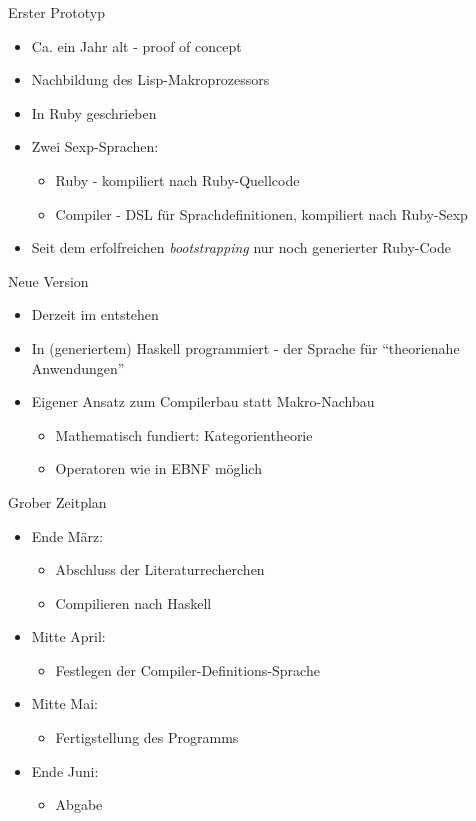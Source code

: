 \documentclass{beamer}
\begin{document}
\begin{frame}{Erster Prototyp}
  \begin{itemize}
  \item Ca. ein Jahr alt - proof of concept
  \item Nachbildung des Lisp-Makroprozessors
  \item In Ruby geschrieben
  \item Zwei Sexp-Sprachen:
    \begin{itemize}
    \item Ruby - kompiliert nach Ruby-Quellcode
    \item Compiler - DSL für Sprachdefinitionen, kompiliert nach Ruby-Sexp
    \end{itemize}
  \item Seit dem erfolfreichen \textit{bootstrapping} nur noch
    generierter Ruby-Code
  \end{itemize}
\end{frame}

\begin{frame}{Neue Version}
  \begin{itemize}
  \item Derzeit im entstehen
  \item In (generiertem) Haskell programmiert - der Sprache für ``theorienahe Anwendungen''
  \item Eigener Ansatz zum Compilerbau statt Makro-Nachbau
    \begin{itemize}
    \item Mathematisch fundiert: Kategorientheorie
    \item Operatoren wie in EBNF möglich
    \end{itemize}  
  \end{itemize}
\end{frame}

\begin{frame}{Grober Zeitplan}
  \begin{itemize}
  \item Ende März:
    \begin{itemize}
    \item Abschluss der Literaturrecherchen
    \item Compilieren nach Haskell
    \end{itemize}
  \item Mitte April:
    \begin{itemize}
    \item Festlegen der Compiler-Definitions-Sprache
    \end{itemize}
  \item Mitte Mai:
    \begin{itemize}
    \item Fertigstellung des Programms
    \end{itemize}
  \item Ende Juni:
    \begin{itemize}
    \item Abgabe
    \end{itemize}
  \end{itemize}
\end{frame}
\end{document}
